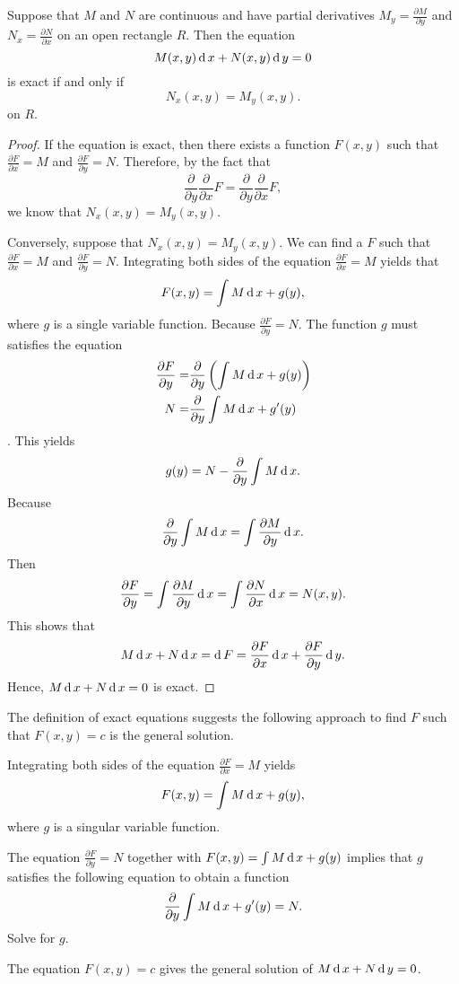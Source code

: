 \begin{theorem}\label{thm:exactness}
  Suppose that $M$ and $N$ are continuous and have partial derivatives $M_y=\frac{\partial M}{\partial y}$ and $N_x=\frac{\partial N}{\partial x}$ on an open rectangle $R$. Then the equation 
  \[M(x,y) \operatorname{d} x +  N(x,y) \operatorname{d} y=0\]
	is exact if and only if 
	\[N_x(x,y) = M_y(x,y).\]
  on $R$.
\end{theorem}
\begin{proof}
  If the equation is exact, then there exists a function $F(x, y)$ such that $\frac{\partial F}{\partial x}=M$ and $\frac{\partial F}{\partial y}=N$. Therefore, by the fact that 
  \[\frac{\partial}{\partial y}\frac{\partial}{\partial x}F=\frac{\partial}{\partial y}\frac{\partial}{\partial x}F,\]
  we know that $N_x(x,y) = M_y(x,y)$.

  Conversely, suppose that $N_x(x,y) = M_y(x,y)$. We can find a $F$ such that $\frac{\partial F}{\partial x}=M$ and $\frac{\partial F}{\partial y}=N$.
  Integrating both sides of the equation $\frac{\partial F}{\partial x}=M$ yields that
  \[F(x, y)=\int M \operatorname{d} x+g(y),\]
  where $g$ is a single variable function.
  Because $\frac{\partial F}{\partial y}=N$. The function $g$ must satisfies the equation
  \[
    \begin{aligned}
      \frac{\partial F}{\partial y}=&\frac{\partial }{\partial y}\left(\int M \operatorname{d} x+g(y)\right)\\
      N=&\frac{\partial}{\partial y}\int M \operatorname{d} x + g'(y)
    \end{aligned}
    \].
   This yields 
    \[g(y)=N-\frac{\partial}{\partial y}\int M \operatorname{d} x.\]
  Because 
  \[\frac{\partial}{\partial y}\int M \operatorname{d} x=\int \frac{\partial M}{\partial y} \operatorname{d} x.\]
  Then 
  \[\frac{\partial F}{\partial y}=\int \frac{\partial M}{\partial y}\operatorname{d} x=\int \frac{\partial N}{\partial x}\operatorname{d} x=N(x, y).\]
  This shows that 
  \[M\operatorname{d} x + N\operatorname{d} x=\operatorname{d} F =\frac{\partial F}{\partial x}\operatorname{d} x+\frac{\partial F}{\partial y}\operatorname{d} y.\]
  Hence, $M\operatorname{d} x + N\operatorname{d} x=0$ is exact. 
\end{proof}

The definition of exact equations suggests the following approach to find $F$ such that $F(x, y)=c$ is the general solution.
\begin{steps}
  \item Integrating both sides of the equation $\frac{\partial F}{\partial x}=M$ yields
  \[F(x, y)=\int M\operatorname{d} x + g(y),\]
  where $g$ is a singular variable function.
  \item The equation $\frac{\partial F}{\partial y}=N$ together with $F(x, y)=\int M\operatorname{d} x + g(y)$ implies that $g$ satisfies the following equation to obtain a function
  \[\frac{\partial}{\partial y}\int M\operatorname{d} x+g'(y)=N.\] Solve for $g$.
  \item The equation $F(x, y)=c$ gives the general solution of $M\operatorname{d} x + N\operatorname{d} y=0$.
\end{steps}

